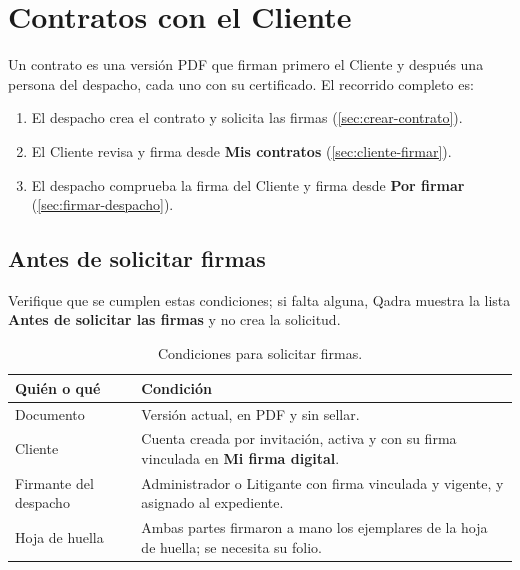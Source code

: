 \chapter{Contratos con el Cliente}\label{cap:contratos}

Un contrato es una versión PDF que firman primero el Cliente y después una
persona del despacho, cada uno con su certificado. El recorrido completo es:

\begin{enumerate}
  \item El despacho crea el contrato y solicita las firmas
        (\cref{sec:crear-contrato}).
  \item El Cliente revisa y firma desde \textbf{Mis contratos} (\cref{sec:cliente-firmar}).
  \item El despacho comprueba la firma del Cliente y firma desde
        \textbf{Por firmar} (\cref{sec:firmar-despacho}).
\end{enumerate}


\section{Antes de solicitar firmas}\label{sec:contrato-requisitos}

Verifique que se cumplen estas condiciones; si falta alguna, Qadra
muestra la lista \textbf{Antes de solicitar las firmas} y no crea la
solicitud.

\begin{table}[H]
  \centering
  \caption{Condiciones para solicitar firmas.}\label{tab:contrato-requisitos}
  \begin{tabularx}{\textwidth}{L{3.6cm} Y}
    \toprule
    \textbf{Quién o qué} & \textbf{Condición} \\
    \midrule
    Documento & Versión actual, en PDF y sin sellar. \\
    Cliente   & Cuenta creada por invitación, activa y con su firma vinculada
                en \textbf{Mi firma digital}. \\
    Firmante del despacho & Administrador o Litigante con firma vinculada y
                vigente, y asignado al expediente. \\
    Hoja de huella & Ambas partes firmaron a mano los ejemplares de la hoja de
                huella; se necesita su folio. \\
    \bottomrule
  \end{tabularx}
\end{table}

